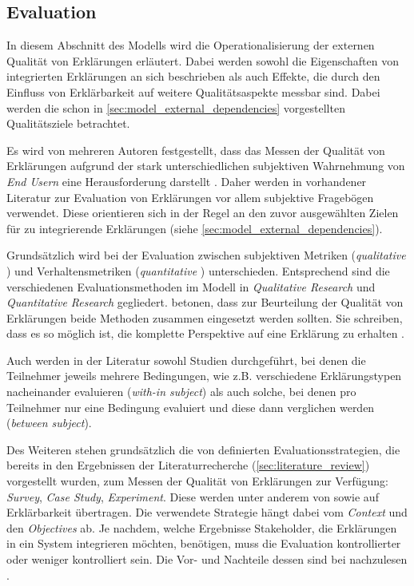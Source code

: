 \subsection{Evaluation}
\label{sec:model_evaluation_description}

In diesem Abschnitt des Modells wird die Operationalisierung der externen Qualität von Erklärungen erläutert. Dabei werden sowohl die Eigenschaften von integrierten Erklärungen an sich beschrieben als auch Effekte, die durch den Einfluss von Erklärbarkeit auf weitere Qualitätsaspekte messbar sind. Dabei werden die schon in \autoref{sec:model_external_dependencies} vorgestellten Qualitätsziele betrachtet.

Es wird von mehreren Autoren festgestellt, dass das Messen der Qualität von Erklärungen aufgrund der stark unterschiedlichen subjektiven Wahrnehmung von \textit{End Usern}  eine Herausforderung darstellt \cite{nunes_systematic_2017, eiband_impact_2019, kouki_user_2017}. Daher werden in vorhandener Literatur zur Evaluation von Erklärungen vor allem subjektive Fragebögen verwendet. Diese orientieren sich in der Regel an den zuvor ausgewählten Zielen für zu integrierende Erklärungen (siehe \autoref{sec:model_external_dependencies}).

Grundsätzlich wird bei der Evaluation zwischen subjektiven Metriken (\textit{qualitative} \citeauthor{wohlin2012experimentation}) und Verhaltensmetriken (\textit{quantitative} \cite{wohlin2012experimentation}) unterschieden. Entsprechend sind die verschiedenen Evaluationsmethoden im Modell in \textit{Qualitative Research} und \textit{Quantitative Research} gegliedert. \citeauthor{waa_evaluating_2021} betonen, dass zur Beurteilung der Qualität von Erklärungen beide Methoden zusammen eingesetzt werden sollten. Sie schreiben, dass es so möglich ist, die \glqq komplette Perspektive\grqq{} auf eine Erklärung zu erhalten \cite[übersetzt vgl.][]{waa_evaluating_2021}.

Auch werden in der Literatur sowohl Studien durchgeführt, bei denen die Teilnehmer jeweils mehrere Bedingungen, wie z.B. verschiedene Erklärungstypen nacheinander evaluieren (\textit{with-in subject}) als auch solche, bei denen pro Teilnehmer nur eine Bedingung evaluiert und diese dann verglichen werden (\textit{between subject}).

Des Weiteren stehen grundsätzlich die von \citeauthor{wohlin2012experimentation} definierten Evaluationsstrategien, die bereits in den Ergebnissen der Literaturrecherche (\autoref{sec:literature_review}) vorgestellt wurden, zum Messen der Qualität von Erklärungen zur Verfügung: \textit{Survey}, \textit{Case Study}, \textit{Experiment}. Diese werden unter anderem von \citeauthor{ribera2019can} sowie \citeauthor{doshi2017towards} auf Erklärbarkeit übertragen. Die verwendete Strategie hängt dabei vom \textit{Context} und den \textit{Objectives} ab. Je nachdem, welche Ergebnisse Stakeholder, die Erklärungen in ein System integrieren möchten, benötigen, muss die Evaluation kontrollierter oder weniger kontrolliert sein. Die Vor- und Nachteile dessen sind bei \citeauthor{wohlin2012experimentation} nachzulesen \cite{wohlin2012experimentation}.

